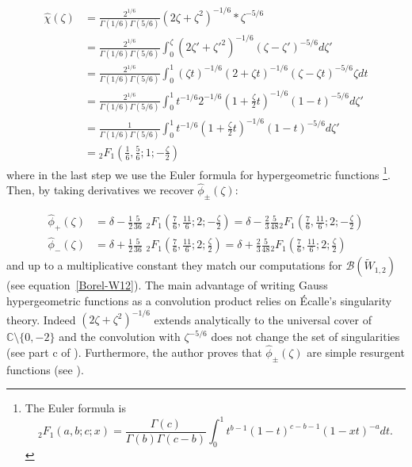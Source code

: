 \documentclass{article}
\newcommand{\C}{\mathbb{C}}
\newcommand{\borel}{\mathcal{B}}
\theoremstyle{definition}
\theoremstyle{plain}
\begin{document}
\begin{align*}
\hat{\chi}(\zeta)&=\frac{2^{1/6}}{\Gamma(1/6)\Gamma(5/6)}(2\zeta+\zeta^2)^{-1/6}\ast \zeta^{-5/6}\\
&=\frac{2^{1/6}}{\Gamma(1/6)\Gamma(5/6)}\int_0^{\zeta}(2\zeta'+\zeta'^2)^{-1/6} (\zeta-\zeta')^{-5/6}d\zeta'\\
&=\frac{2^{1/6}}{\Gamma(1/6)\Gamma(5/6)}\int_0^{1}(\zeta t)^{-1/6}(2+\zeta t)^{-1/6} (\zeta-\zeta t)^{-5/6} \zeta dt\\
&=\frac{2^{1/6}}{\Gamma(1/6)\Gamma(5/6)}\int_0^{1} t^{-1/6} 2^{-1/6}(1+\frac{\zeta}{2} t)^{-1/6} (1-t)^{-5/6}d\zeta'\\
&=\frac{1}{\Gamma(1/6)\Gamma(5/6)}\int_0^{1} t^{-1/6} (1+\frac{\zeta}{2} t)^{-1/6} (1-t)^{-5/6}d\zeta'\\
&={}_2F_1\left(\frac{1}{6},\frac{5}{6};1;-\frac{\zeta}{2}\right)
\end{align*}
where in the last step we use the Euler formula for hypergeometric functions \footnote{The Euler formula is \begin{equation}\label{Euler formula}
{}_{2}F_1\left(a,b;c;x\right)=\frac{\Gamma(c)}{\Gamma(b)\Gamma(c-b)}\int_0^1 t^{b-1}(1-t)^{c-b-1}(1-xt)^{-a}dt.
\end{equation}}. Then, by taking derivatives we recover $\hat{\phi}_{\pm}(\zeta)$: 

\begin{align*}
\hat{\phi}_+(\zeta)&=\delta-\frac{1}{2}\frac{5}{36}\,\, {}_2F_1\left(\frac{7}{6},\frac{11}{6};2;-\frac{\zeta}{2}\right)=\delta-\frac{2}{3}\frac{5}{48} {}_2F_1\left(\frac{7}{6},\frac{11}{6};2;-\frac{\zeta}{2}\right)\\
\hat{\phi}_-(\zeta)&=\delta+\frac{1}{2}\frac{5}{36}\,\, {}_2F_1\left(\frac{7}{6},\frac{11}{6};2;\frac{\zeta}{2}\right)=\delta+\frac{2}{3}\frac{5}{48} {}_2F_1\left(\frac{7}{6},\frac{11}{6};2;\frac{\zeta}{2}\right)
\end{align*} 
and up to a multiplicative constant they match our computations for $\borel(\tilde{W}_{1,2})$ (see equation~\eqref{Borel-W12}).
The main advantage of writing Gauss hypergeometric functions as a convolution product relies on \'Ecalle's singularity theory. Indeed $(2\zeta+\zeta^2)^{-1/6}$ extends analytically to the universal cover of $\C\setminus\lbrace 0,-2\rbrace$ and the convolution with $\zeta^{-5/6}$ does not change the set of singularities (see part c of \cite[Section 6.14.5]{diverg-resurg-i}). Furthermore, the author proves that $\hat{\phi}_{\pm}(\zeta)$ are simple resurgent functions (see \cite[Lemma 6.106]{diverg-resurg-i}). %
\end{document}

